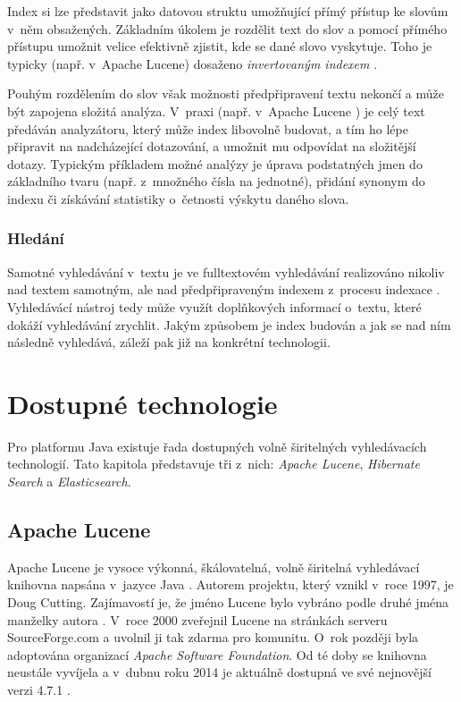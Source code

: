 \documentclass[11pt,oneside]{fithesis2}
\begin{document}
Index si lze představit jako datovou struktu umožňující přímý přístup ke slovům v~něm obsažených. Základním úkolem je rozdělit text do slov a pomocí přímého přístupu umožnit velice efektivně zjistit, kde se dané slovo vyskytuje. Toho je typicky (např. v~Apache Lucene) dosaženo \emph{invertovaným indexem} \cite[s.~35]{LuceneAction}. %

Pouhým rozdělením do slov však možnosti předpřipravení textu nekončí a může být zapojena složitá analýza. V~praxi (např. v~Apache Lucene \cite[s.~35]{LuceneAction}) je celý text předáván analyzátoru, který může index libovolně budovat, a tím ho lépe připravit na nadcházející dotazování, a umožnit mu odpovídat na složitější dotazy. Typickým příkladem možné analýzy je úprava podstatných jmen do základního tvaru (např. z~množného čísla na jednotné), přidání synonym do indexu či získávání statistiky o~četnosti výskytu daného slova.

\subsection{Hledání}
Samotné vyhledávání v~textu je ve fulltextovém vyhledávání realizováno nikoliv nad textem samotným, ale nad předpřipraveným indexem z~procesu indexace \cite[s.~15]{HibernateSearchAction}. Vyhledávácí nástroj tedy může využít doplňkových informací o~textu, které dokáží vyhledávání zrychlit. Jakým způsobem je index budován a jak se nad ním následně vyhledává, záleží pak již na konkrétní technologii.

\chapter{Dostupné technologie}
\label{DostupneTechnologieChapter}
Pro platformu Java existuje řada dostupných volně širitelných vyhledávacích technologií. Tato kapitola představuje tři z~nich: \emph{Apache Lucene}, \emph{Hibernate Search} a \emph{Elasticsearch}.

\section{Apache Lucene}
Apache Lucene je vysoce výkonná, škálovatelná, volně širitelná vyhledávací knihovna napsána v~jazyce Java \cite[s.~6]{LuceneAction}. Autorem projektu, který vznikl v~roce 1997, je Doug Cutting. Zajímavostí je, že jméno Lucene bylo vybráno podle druhé jména manželky autora \cite[s.~6]{LuceneAction}. V~roce 2000 zveřejnil Lucene na stránkách serveru SourceForge.com a uvolnil ji tak zdarma pro komunitu. O~rok později byla adoptována organizací \emph{Apache Software Foundation}. Od té doby se knihovna neustále vyvíjela a v~dubnu roku 2014 je aktuálně dostupná ve své nejnovější verzi 4.7.1 \cite[s.~6]{LuceneAction}.
\end{document}
